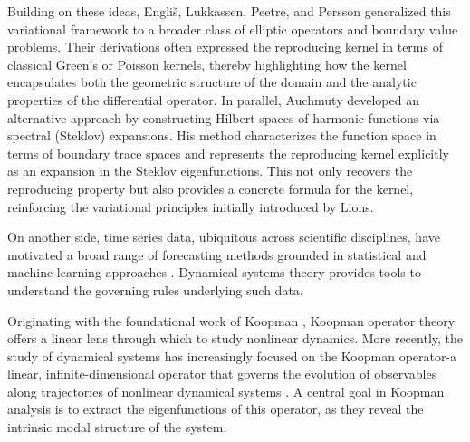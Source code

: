 \documentclass[11pt]{article}
\theoremstyle{plain}
\begin{document}
Building on these ideas, Engliš, Lukkassen, Peetre, and Persson \cite{englis2004formula} generalized this variational framework to a broader class of elliptic operators and boundary value problems. Their derivations often expressed the reproducing kernel in terms of classical Green’s or Poisson kernels, thereby highlighting how the kernel encapsulates both the geometric structure of the domain and the analytic properties of the differential operator. In parallel, Auchmuty \cite{auchmuty2009reproducing} developed an alternative approach by constructing Hilbert spaces of harmonic functions via spectral (Steklov) expansions. His method characterizes the function space in terms of boundary trace spaces and represents the reproducing kernel explicitly as an expansion in the Steklov eigenfunctions. This not only recovers the reproducing property but also provides a concrete formula for the kernel, reinforcing the variational principles initially introduced by Lions.

On another side, time series data, ubiquitous across scientific disciplines, have motivated a broad range of forecasting methods grounded in statistical and machine learning approaches \cite{kantz97,CASDAGLI1989, yk1, yk2, yk3, yk4, survey_kf_ann,Sindy,jaideep1,nielsen2019practical,abarbanel2012analysis, pillonetto2011new,wang2011predicting,brunton2016discovering,lusch2018deep,callaham2021learning,kaptanoglu2021physicsconstrained,kutz2022parsimony}. Dynamical systems theory provides tools to understand the governing rules underlying such data. 

Originating with the foundational work of Koopman \cite{koopman1932dynamical}, Koopman operator theory offers a linear lens through which to study nonlinear dynamics. More recently, the study of dynamical systems has increasingly focused on the Koopman operator-a linear, infinite-dimensional operator that governs the evolution of observables along trajectories of nonlinear dynamical systems \cite{mezic2005spectral}. A central goal in Koopman analysis is to extract the eigenfunctions of this operator, as they reveal the intrinsic modal structure of the system. 
\end{document}
